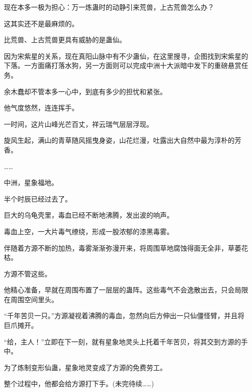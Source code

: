 \begin{this_body}
现在本多一极为担心：万一炼蛊时的动静引来荒兽，上古荒兽怎么办？

这其实还不是最麻烦的。

比荒兽、上古荒兽更具有威胁的是蛊仙。

因为宋紫星的关系，现在真阳山脉中有不少蛊仙，在这里搜寻，企图找到宋紫星的下落。一方面痛打落水狗，另一方面则可以完成中洲十大派暗中发下的重磅悬赏任务。

余木蠢却不管本多一心中，到底有多少的担忧和紧张。

他气度悠然，连连挥手。

一时间，这片山峰光芒百丈，祥云瑞气层层浮现。

旋风生起，满山的青草随风摇曳身姿，山花烂漫，吐露出大自然中最为淳朴的芳香。

……

中洲，星象福地。

半个时辰已经过去了。

巨大的乌龟壳里，毒血已经不断地沸腾，发出波的响声。

毒血上空，一大片毒气缭绕，形成一股浓郁的漆黑毒雾。

伴随着方源不断的加热，毒雾渐渐弥漫开来，将周围草地腐蚀得面无全非，草萎花枯。

方源不管这些。

他精心准备，早就在周围布置了一层层的蛊阵。这些毒气不会逸散出去，只会局限在周围空间里头。

“千年苦贝一只。”方源凝视着沸腾的毒血，忽然向后方伸出一只仙僵怪臂，并且将巨爪摊开。

“给，主人！”立即在下一刻，就有星象地灵头上托着千年苦贝，将其交到方源的手中。

为了炼制变形仙蛊，星象地灵变成了方源的免费劳工。

整个过程中，他都会给方源打下手。(未完待续……)

\end{this_body}

